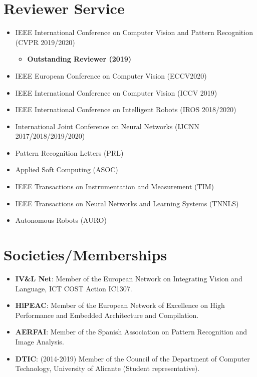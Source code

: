 \documentclass[8pt]{article}
\begin{document}
\section*{Reviewer Service}

\begin{itemize}
  \item IEEE International Conference on Computer Vision and Pattern Recognition (CVPR 2019/2020)
  \begin{itemize}
    \item \textbf{Outstanding Reviewer (2019)}
  \end{itemize}
  \item IEEE European Conference on Computer Vision (ECCV2020)
  \item IEEE International Conference on Computer Vision (ICCV 2019)
  \item IEEE International Conference on Intelligent Robots (IROS 2018/2020)
  \item International Joint Conference on Neural Networks (IJCNN 2017/2018/2019/2020)
  \item Pattern Recognition Letters (PRL)
  \item Applied Soft Computing (ASOC)
  \item IEEE Transactions on Instrumentation and Measurement (TIM)
  \item IEEE Transactions on Neural Networks and Learning Systems (TNNLS)
  \item Autonomous Robots (AURO)
\end{itemize}

\section*{Societies/Memberships}

\begin{itemize}
	\item \textbf{IV\&L Net}: Member of the European Network on Integrating Vision and Language, ICT COST Action IC1307.
	\item \textbf{HiPEAC}: Member of the European Network of Excellence on High Performance and Embedded Architecture and Compilation.
	\item \textbf{AERFAI}: Member of the Spanish Association on Pattern Recognition and Image Analysis.
	\item \textbf{DTIC}: (2014-2019) Member of the Council of the Department of Computer Technology, University of Alicante (Student representative).
\end{itemize}
\end{document}
